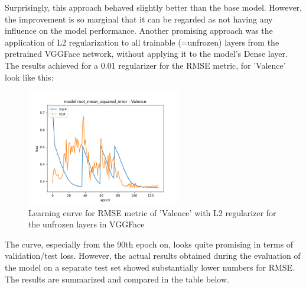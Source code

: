 Surprisingly, this approach behaved slightly better than the base model. However, the improvement is so marginal that it can be regarded as not having any influence on the model performance.
\newline\newline
Another promising approach was the application of L2 regularization to all trainable (=unfrozen) layers from the pretrained VGGFace network, without applying it to the model's Dense layer. The results achieved for a 0.01 regularizer for the RMSE metric, for 'Valence' look like this:

\begin{figure}[H]
  \begin{center}
  \includegraphics[angle=0, width=0.6\textwidth]{Figures/rmse_out1_L2VGGFace.png}
  \caption{Learning curve for RMSE metric of 'Valence' with L2 regularizer for the unfrozen layers in VGGFace}
  \label{fig:AblationL2VGGFace}
  \end{center}
\end{figure}

The curve, especially from the 90th epoch on, looks quite promising in terms of validation/test loss. However, the actual results obtained during the evaluation of the model on a separate test set showed substantially lower numbers for RMSE. The results are summarized and compared in the table below.

